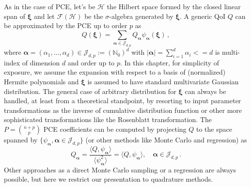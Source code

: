 As in the case of PCE, let's be $\mathcal{H}$ the Hilbert space formed by the closed linear span of $\bm{\xi}$ and let $\mathcal{F}(\mathcal{H})$ be the $\sigma$-algebra generated by $\bm{\xi}$. A 
generic QoI $Q$ can be approximated by the PCE up to order $p$ as
\begin{equation}
Q(\bm \xi) = \sum_{\bm{\alpha}\in\mathcal{J}_{d,p}}Q_{\bm{\alpha}}\psi_{\bm \alpha}(\bm \xi)\,,
\end{equation}
where $\bm{\alpha} = (\alpha_1,...,\alpha_d) \in \mathcal{J}_{d,p}:=(\mathbb{N}_0)^d$ with $|\bm{\alpha}| = \sum_{i=1}^{d} \alpha_i<= d$ is multi-index of dimension $d$ and order up to $p$.
In this chapter, for simplicity of exposure, we assume the expansion with respect to a basis of (normalized) Hermite polynomials and $\bm\xi$ is assumed to have standard multivariate Gaussian distribution.
The general case of arbitrary distribution for $\bm\xi$ can always be handled, at least from a theoretical standpoint, by resorting to input parameter transformations as the inverse of cumulative distribution function or other more sophisticated transformations like the Rosenblatt transformation.
The $P={n+p\choose p}$ PCE coefficients can be computed by projecting $Q$ to the space spanned by  $\{\psi_{\bm \alpha}, \bm{\alpha} \in \mathcal{J}_{d,p} \}$ (or other methods like Monte Carlo and regression) as
\begin{equation}
Q_{\bm{\alpha}} = \frac{\langle Q, \psi_{\bm \alpha} \rangle}{\langle \psi_{\bm \alpha}^2 \rangle} =\langle Q, \psi_{\bm \alpha} \rangle,  \quad \bm{\alpha} \in \mathcal{J}_{d,p}\,.
\end{equation}
Other approaches as a direct Monte Carlo sampling or a regression are always possible, but here we restrict our presentation to quadrature methods.

